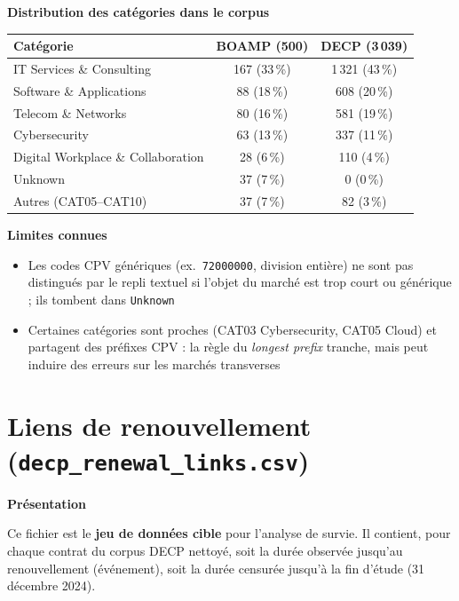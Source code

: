 \documentclass[12pt,a4paper]{article}
\begin{document}
\medskip
\textbf{Distribution des catégories dans le corpus}

\begin{center}
\begin{tabular}{lcc}
\toprule
\textbf{Catégorie} & \textbf{BOAMP (500)} &
  \textbf{DECP (3\,039)} \\
\midrule
IT Services \& Consulting         & 167 (33\,\%) & 1\,321 (43\,\%) \\
Software \& Applications          &  88 (18\,\%) &   608 (20\,\%) \\
Telecom \& Networks               &  80 (16\,\%) &   581 (19\,\%) \\
Cybersecurity                     &  63 (13\,\%) &   337 (11\,\%) \\
Digital Workplace \& Collaboration &  28 (6\,\%) &   110 (4\,\%) \\
Unknown                           &  37 (7\,\%) &     0 (0\,\%) \\
Autres (CAT05--CAT10)             &  37 (7\,\%) &    82 (3\,\%) \\
\bottomrule
\end{tabular}
\end{center}

\medskip
\textbf{Limites connues}

\begin{itemize}
  \item[---] Les codes CPV génériques (ex.\ \texttt{72000000},
    division entière) ne sont pas distingués par le repli textuel si
    l'objet du marché est trop court ou générique ; ils tombent dans
    \texttt{Unknown}
  \item[---] Certaines catégories sont proches (CAT03 Cybersecurity,
    CAT05 Cloud) et partagent des préfixes CPV : la règle du
    \textit{longest prefix} tranche, mais peut induire des erreurs sur les
    marchés transverses
\end{itemize}

\section{Liens de renouvellement (\texttt{decp\_renewal\_links.csv})}
\label{sec:renewal}

\textbf{Présentation}

Ce fichier est le \textbf{jeu de données cible} pour l'analyse de survie.
Il contient, pour chaque contrat du corpus DECP nettoyé, soit la durée
observée jusqu'au renouvellement (événement), soit la durée censurée jusqu'à
la fin d'étude (31 décembre 2024).
\end{document}

